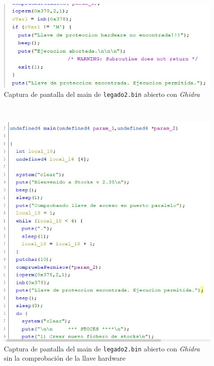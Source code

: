 \documentclass{article}
\begin{document}
\begin{figure}[h!]
    \centering
    \includegraphics[scale=0.9]{images/mainLeg2Viejo.jpg}
    \caption{Captura de pantalla del main de \texttt{legado2.bin} abierto con \textit{Ghidra}}
    \label{fig:mainGhDesc}
\end{figure}\\

\begin{figure}[h!]
    \centering
    \includegraphics[scale=0.9]{images/mainGhidra.jpg}
    \caption{Captura de pantalla del main de \texttt{legado2.bin} abierto con \textit{Ghidra} sin la comprobación de la llave hardware}
    \label{fig:mainGh}
\end{figure}\\
\end{document}
